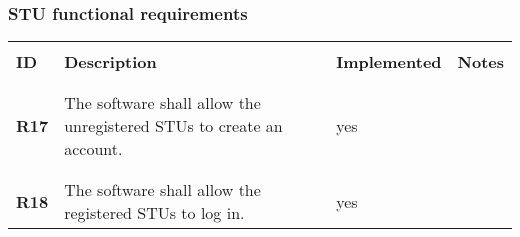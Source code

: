 \subsubsection*{STU functional requirements}

\renewcommand{\arraystretch}{0.5}
\begin{longtable}[H]{l p{8cm} l p{2cm}}
    \hline
                 &                                                                                                                                                                                                                       &                      &                                                                                         \\
    \textbf{ID}  & \textbf{Description}                                                                                                                                                                                                  & \textbf{Implemented} & \textbf{Notes}                                                                          \\
                 &                                                                                                                                                                                                                       &                      &                                                                                         \\\hline & & & \\
    \textbf{R17} & The software shall allow the unregistered STUs to create an account.                                                                                                                                                  & {\color{green}yes}   &                                                                                         \\
                 &                                                                                                                                                                                                                       &                      &                                                                                         \\\hline & & & \\
    \textbf{R18} & The software shall allow the registered STUs to log in.                                                                                                                                                               & {\color{green}yes}   &                                                                                         \\

\end{longtable}
